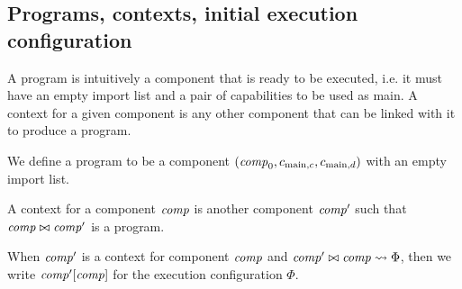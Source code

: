 \documentclass[a4paper]{article}
\begin{document}
\subsection{Programs, contexts, initial execution configuration}
\label{sec:programs}

A program is intuitively a component that is ready to be executed, i.e. it must have an empty import list and a pair of capabilities to be used as main.
A context for a given component is any other component that can be linked with it to produce a program.

\begin{definition}
  We define a program to be a component $(\var{comp}_0,c_{\mathrm{main},c}, c_{\mathrm{main},d})$ with an empty import list.

  A context for a component $\var{comp}$ is another component $\var{comp}'$ such that $\var{comp} \bowtie \var{comp}'$ is a program.
\end{definition}

\begin{definition}
  \begin{mathpar}
  \end{mathpar}
\end{definition}

\begin{definition}
  When $\var{comp'}$ is a context for component $\var{comp}$ and $\var{comp}' \bowtie \var{comp} \rightsquigarrow \Phi$, 
  then we write $\plug{\var{comp'}}{\var{comp}}$ for the execution configuration $\Phi$.
\end{definition}
\end{document}
